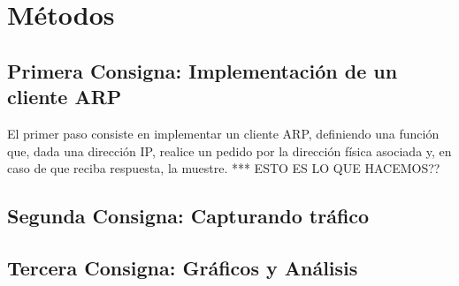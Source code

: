 \section{M\'etodos}


\subsection{Primera Consigna: Implementaci\'on de un cliente ARP}
El primer paso consiste en implementar un cliente ARP, definiendo una funci\'on que, dada una direcci\'on IP, realice un pedido por la direcci\'on f\'isica asociada y, en caso de que reciba respuesta, la muestre. *** ESTO ES LO QUE HACEMOS??

\subsection{Segunda Consigna: Capturando tr\'afico}

\subsection{Tercera Consigna: Gr\'aficos y An\'alisis}

